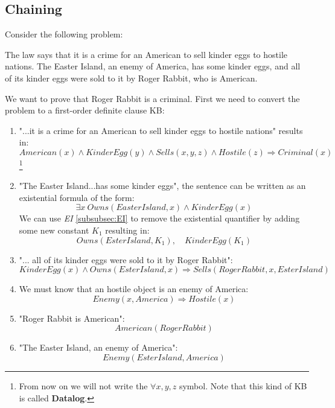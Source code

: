 \documentclass[10pt,a4paper]{article}
\begin{document}
\subsection{Chaining}
Consider the following problem:
\begin{center}
\begin{textit}
The law says that it is a crime for an American to sell kinder eggs to hostile nations. The Easter Island, an enemy of America, has some kinder eggs, and all of its kinder eggs were sold to it by Roger Rabbit, who is American.

\end{textit}
\end{center}
We want to prove that Roger Rabbit is a criminal. First we need to convert the problem to a first-order definite clause KB:
\begin{enumerate}
\item "...it is a crime for an American to sell kinder eggs to hostile nations" results in:
\[American(x)\wedge KinderEgg(y)\wedge Sells(x,y,z)\wedge Hostile(z)\Rightarrow Criminal(x)\] \footnote{From now on we will not write the $\forall x,y,z$ symbol. Note that this kind of KB is called \textbf{Datalog}.}

\item "The Easter Island...has some kinder eggs", the sentence can be written as an existential formula of the form:
\[\exists x\ Owns(EasterIsland,x)\wedge KinderEgg(x)\]
We can use \textit{EI} \ref{subsubsec:EI} to remove the existential quantifier by adding some new constant $K_1$ resulting in:
\[Owns(EsterIsland,K_1),\quad KinderEgg(K_1)\]

\item "... all of its kinder eggs were sold to it by Roger Rabbit":
\[KinderEgg(x)\wedge Owns(EsterIsland,x)\Rightarrow Sells(RogerRabbit,x,EsterIsland)\]

\item We must know that an hostile object is an enemy of America:
\[Enemy(x,America)\Rightarrow Hostile(x)\]

\item "Roger Rabbit is American":
\[American(RogerRabbit)\]


\item "The Easter Island, an enemy of America":
\[Enemy(EsterIsland,America)\]
\end{enumerate}
\end{document}
